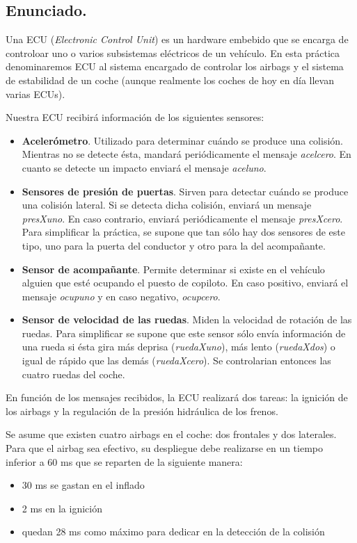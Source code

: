 \documentclass{article}
\begin{document}
\subsection{Enunciado.}

Una ECU (\emph{Electronic Control Unit}) es un hardware embebido que se encarga de controloar uno o varios subsistemas eléctricos de un vehículo. En esta práctica denominaremos ECU al sistema encargado de controlar los airbags y el sistema de estabilidad de un coche (aunque realmente los coches de hoy en día llevan varias ECUs).

Nuestra ECU recibirá información de los siguientes sensores:
\begin{itemize}
	\item \textbf{Acelerómetro}. Utilizado para determinar cuándo se produce una colisión. Mientras no se detecte ésta, mandará periódicamente el mensaje \emph{acelcero}. En cuanto se detecte un impacto enviará el mensaje \emph{aceluno}.
	\item \textbf{Sensores de presión de puertas}. Sirven para detectar cuándo se produce una colisión lateral. Si se detecta dicha colisión, enviará un mensaje \emph{presXuno}. En caso contrario, enviará periódicamente el mensaje \emph{presXcero}. Para simplificar la práctica, se supone que tan sólo hay dos sensores de este tipo, uno para la puerta del conductor y otro para la del acompañante.
	\item \textbf{Sensor de acompañante}. Permite determinar si existe en el vehículo alguien que esté ocupando el puesto de copiloto. En caso positivo, enviará el mensaje \emph{ocupuno} y en caso negativo, \emph{ocupcero}.
	\item \textbf{Sensor de velocidad de las ruedas}. Miden la velocidad de rotación de las ruedas. Para simplificar se supone que este sensor sólo envía información de una rueda si ésta gira más deprisa (\emph{ruedaXuno}), más lento (\emph{ruedaXdos}) o igual de rápido que las demás (\emph{ruedaXcero}). Se controlarian entonces las cuatro ruedas del coche.
\end{itemize}

En función de los mensajes recibidos, la ECU realizará dos tareas: la ignición de los airbags y la regulación de la presión hidráulica de los frenos.

Se asume que existen cuatro airbags en el coche: dos frontales y dos laterales. Para que el airbag sea efectivo, su despliegue debe realizarse en un tiempo inferior a 60 ms que se reparten de la siguiente manera:
\begin{itemize}
	\item 30 ms se gastan en el inflado
	\item 2 ms en la ignición
	\item quedan 28 ms como máximo para dedicar en la detección de la colisión
\end{itemize}
\end{document}
